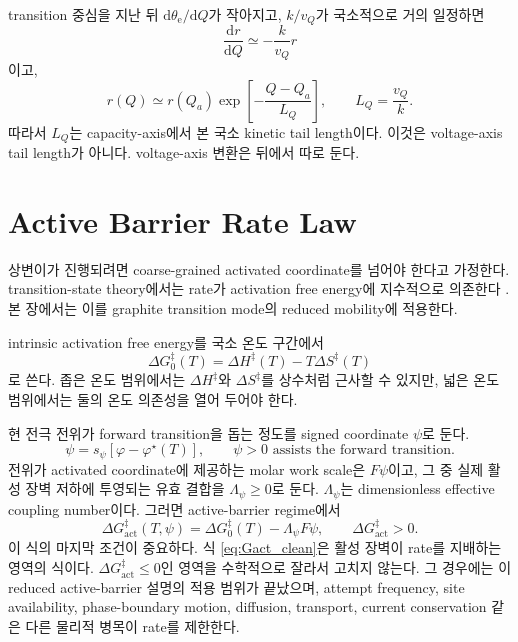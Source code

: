 \documentclass[11pt,a4paper]{article}
\newcommand{\dd}{\mathrm{d}}
\begin{document}
transition 중심을 지난 뒤 \(\dd\theta_{\mathrm e}/\dd Q\)가 작아지고, \(k/v_Q\)가 국소적으로 거의 일정하면
\begin{equation}
\frac{\dd r}{\dd Q}
\simeq
-\frac{k}{v_Q}r
\end{equation}
이고,
\begin{equation}
\boxed{
r(Q)
\simeq
r(Q_a)
\exp\!\left[-\frac{Q-Q_a}{L_Q}\right],
\qquad
L_Q=\frac{v_Q}{k}.
}
\label{eq:LQ_clean}
\end{equation}
따라서 \(L_Q\)는 capacity-axis에서 본 국소 kinetic tail length이다. 이것은 voltage-axis tail length가 아니다. voltage-axis 변환은 뒤에서 따로 둔다.

\section{Active Barrier Rate Law}

상변이가 진행되려면 coarse-grained activated coordinate를 넘어야 한다고 가정한다. transition-state theory에서는 rate가 activation free energy에 지수적으로 의존한다 \cite{Eyring1935,EyringChemRev1935}. 본 장에서는 이를 graphite transition mode의 reduced mobility에 적용한다.

intrinsic activation free energy를 국소 온도 구간에서
\begin{equation}
\Delta G_0^\ddagger(T)
=
\Delta H^\ddagger(T)
-
T\Delta S^\ddagger(T)
\label{eq:G0_clean}
\end{equation}
로 쓴다. 좁은 온도 범위에서는 \(\Delta H^\ddagger\)와 \(\Delta S^\ddagger\)를 상수처럼 근사할 수 있지만, 넓은 온도 범위에서는 둘의 온도 의존성을 열어 두어야 한다.

현 전극 전위가 forward transition을 돕는 정도를 signed coordinate \(\psi\)로 둔다.
\begin{equation}
\psi
=
s_\psi\left[\varphi-\varphi^\star(T)\right],
\qquad
\psi>0
\text{ assists the forward transition.}
\label{eq:psi_clean}
\end{equation}
전위가 activated coordinate에 제공하는 molar work scale은 \(F\psi\)이고, 그 중 실제 활성 장벽 저하에 투영되는 유효 결합을 \(\Lambda_\psi\ge0\)로 둔다. \(\Lambda_\psi\)는 dimensionless effective coupling number이다. 그러면 active-barrier regime에서
\begin{equation}
\boxed{
\Delta G_{\mathrm{act}}^\ddagger(T,\psi)
=
\Delta G_0^\ddagger(T)
-
\Lambda_\psi F\psi,
\qquad
\Delta G_{\mathrm{act}}^\ddagger>0 .
}
\label{eq:Gact_clean}
\end{equation}
이 식의 마지막 조건이 중요하다. 식 \eqref{eq:Gact_clean}은 활성 장벽이 rate를 지배하는 영역의 식이다. \(\Delta G_{\mathrm{act}}^\ddagger\le0\)인 영역을 수학적으로 잘라서 고치지 않는다. 그 경우에는 이 reduced active-barrier 설명의 적용 범위가 끝났으며, attempt frequency, site availability, phase-boundary motion, diffusion, transport, current conservation 같은 다른 물리적 병목이 rate를 제한한다.
\end{document}
